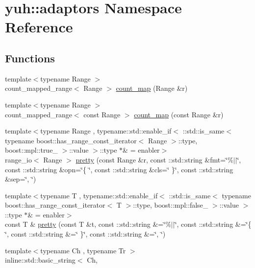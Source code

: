 \hypertarget{namespaceyuh_1_1adaptors}{\section{yuh\-:\-:adaptors \-Namespace \-Reference}
\label{de/d55/namespaceyuh_1_1adaptors}
}
\subsection*{\-Functions}
\begin{DoxyCompactItemize}
\item 
{\footnotesize template$<$typename Range $>$ }\\count\-\_\-mapped\-\_\-range$<$ \-Range $>$ \hyperlink{namespaceyuh_1_1adaptors_acb67fe5826a7f7b7ac61edf1dfcff82f}{count\-\_\-map} (\-Range \&r)
\item 
{\footnotesize template$<$typename Range $>$ }\\count\-\_\-mapped\-\_\-range$<$ const \-Range $>$ \hyperlink{namespaceyuh_1_1adaptors_a6b46059339338da677245db0a97006c6}{count\-\_\-map} (const \-Range \&r)
\item 
{\footnotesize template$<$typename Range , typename\-::std\-::enable\-\_\-if$<$ \-::std\-::is\-\_\-same$<$ typename boost\-::has\-\_\-range\-\_\-const\-\_\-iterator$<$ Range $>$\-::type, boost\-::mpl\-::true\-\_\- $>$\-::value $>$\-::type $\ast$\&  = enabler$>$ }\\range\-\_\-io$<$ \-Range $>$ \hyperlink{namespaceyuh_1_1adaptors_ab9de0351a2c9fea583ddd62cbe4b97f1}{pretty} (const \-Range \&r, const \-::std\-::string \&fmt=\char`\"{}\%$|$$|$\char`\"{}, const \-::std\-::string \&opn=\char`\"{}\{ \char`\"{}, const \-::std\-::string \&cls=\char`\"{} \}\char`\"{}, const \-::std\-::string \&sep=\char`\"{}, \char`\"{})
\item 
{\footnotesize template$<$typename T , typename\-::std\-::enable\-\_\-if$<$ \-::std\-::is\-\_\-same$<$ typename boost\-::has\-\_\-range\-\_\-const\-\_\-iterator$<$ T $>$\-::type, boost\-::mpl\-::false\-\_\- $>$\-::value $>$\-::type $\ast$\&  = enabler$>$ }\\const \-T \& \hyperlink{namespaceyuh_1_1adaptors_ace5fee35d088aaea74d020e1ef20582f}{pretty} (const \-T \&t, const \-::std\-::string \&=\char`\"{}\%$|$$|$\char`\"{}, const \-::std\-::string \&=\char`\"{}\{ \char`\"{}, const \-::std\-::string \&=\char`\"{} \}\char`\"{}, const \-::std\-::string \&=\char`\"{}, \char`\"{})
\item 
{\footnotesize template$<$typename Ch , typename Tr $>$ }\\inline\-::std\-::basic\-\_\-string$<$ \-Ch, \*

\end{DoxyCompactItemize}
